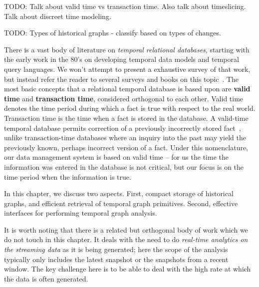 \documentclass{svjour3}
\begin{document}
TODO: Talk about valid time vs transaction time. Also talk about timeslicing. Talk about discreet time modeling.

TODO: Types of historical graphs - classify based on types of changes.



There is a vast body of literature on {\em temporal relational databases}, starting with the early
work in the 80's on developing temporal data models and temporal query
languages. We won't attempt to present a exhaustive survey of that work, but instead refer the reader 
to several surveys and books on this
topic~\cite{Bolour92,DBLP:conf/sigmod/SnodgrassA85,Ozsoyoglu1995,Tansel1993,date2002temporal,tsql2,Salzberg1999}.
The most basic concepts that a relational temporal database is based upon are
\textbf{valid time} and \textbf{transaction time}, considered orthogonal to each other. Valid time denotes the time
period during which a fact is true with respect to the real world. Transaction time is the time
when a fact is stored in the database. 
A valid-time temporal database permits correction of a previously incorrectly stored
fact~\cite{DBLP:conf/sigmod/SnodgrassA85}, unlike transaction-time databases where an
inquiry into the past may yield the previously known, perhaps incorrect version of a fact. 
Under this nomenclature, our data management system is based on valid
time -- for us the time the information was entered in the database is not critical, but our focus
is on the time period when the information is true.



In this chapter, we discuss two aspects. First, compact storage of historical graphs, and efficient retrieval of temporal graph primitives. Second, effective interfaces for performing temporal graph analysis.

It is worth noting that there is a related but orthogonal body of work which we do not touch in this chapter. It deals with the need to do {\em real-time analytics on the streaming data} as it is being generated; here the scope of the analysis typically only includes the latest snapshot or the snapshots from a recent window. The key challenge here is to be able to deal with the high rate at which the data is often generated.
\end{document}
